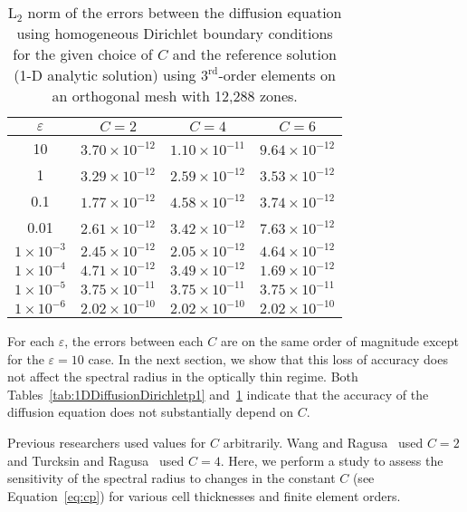 \documentclass[12pt,letterpaper]{article}
\begin{document}
\begin{table}[!h]
\centering
{\renewcommand{\arraystretch}{1.5}
\begin{tabular}{|c|c|c|c|}
\hline
$\varepsilon$ & $C=2$ & $C=4$ & $C=6$ \\\hline
10 & $3.70 \times 10^{-12}$ & $1.10 \times 10^{-11}$ & $9.64 \times 10^{-12}$ \\\hline
1 & $3.29 \times 10^{-12}$ & $2.59 \times 10^{-12}$ & $3.53 \times 10^{-12}$ \\\hline
0.1 & $1.77 \times 10^{-12}$ & $4.58 \times 10^{-12}$ & $3.74 \times 10^{-12}$ \\\hline
0.01 & $2.61 \times 10^{-12}$ & $3.42 \times 10^{-12}$ & $7.63 \times 10^{-12}$ \\\hline
$1 \times 10^{-3}$ & $2.45 \times 10^{-12}$ & $2.05 \times 10^{-12}$ & $4.64 \times 10^{-12}$ \\\hline
$1 \times 10^{-4}$ & $4.71 \times 10^{-12}$ & $3.49 \times 10^{-12}$& $1.69 \times 10^{-12}$ \\\hline
$1 \times 10^{-5}$ & $3.75 \times 10^{-11}$ & $3.75 \times 10^{-11}$ & $3.75 \times 10^{-11}$ \\\hline
$1 \times 10^{-6}$ & $2.02 \times 10^{-10}$ & $2.02 \times 10^{-10}$ & $2.02 \times 10^{-10}$ \\\hline
\end{tabular}}
\caption{L$_2$ norm of the errors between the diffusion equation using homogeneous Dirichlet boundary conditions for the given choice of $C$ and the reference solution (1-D analytic solution) using $3^\text{rd}$-order elements on an orthogonal mesh with 12,288 zones.}
\label{tab:1DDiffusionDirichletp3}
\end{table}
%
For each $\varepsilon$, the errors between each $C$ are on the same order of magnitude except for the $\varepsilon=10$ case. In the next section, we show that this loss of accuracy does not affect the spectral radius in the optically thin regime. Both Tables~\ref{tab:1DDiffusionDirichletp1} and~\ref{tab:1DDiffusionDirichletp3} indicate that the accuracy of the diffusion equation does not substantially depend on $C$.



\label{sec:RhoSensToConstantC}
Previous researchers used values for $C$ arbitrarily. Wang and Ragusa~\cite{WangRagusaDSA} used $C = 2$ and Turcksin and Ragusa~\cite{TurcksinDiscontinuousDSA} used $C = 4$. Here, we perform a study to assess the sensitivity of the spectral radius to changes in the constant $C$ (see Equation~\ref{eq:cp}) for various cell thicknesses and finite element orders. 
\end{document}
